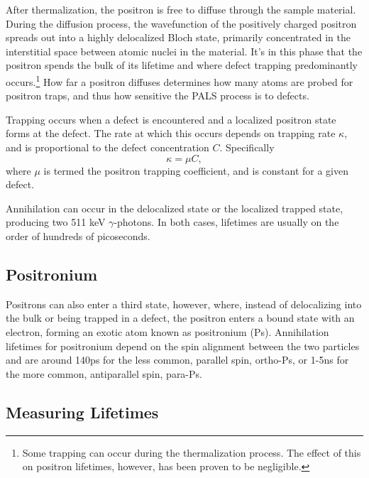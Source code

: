 After thermalization, the positron is free to diffuse through the sample material. During the diffusion process, the wavefunction of the positively charged positron spreads out into a highly delocalized Bloch state, primarily concentrated in the interstitial space between atomic nuclei in the material. It's in this phase that the positron spends the bulk of its lifetime and where defect trapping predominantly occurs.\footnote{Some trapping can occur during the thermalization process. The effect of this on positron lifetimes, however, has been proven to be negligible.} How far a positron diffuses determines how many atoms are probed for positron traps, and thus how sensitive the PALS process is to defects.

Trapping occurs when a defect is encountered and a localized positron state forms at the defect. The rate at which this occurs depends on trapping rate $\kappa$, and is proportional to the defect concentration $C$. Specifically
\begin{equation}
    \kappa = \mu C,
    \label{eq:traprate}
\end{equation}
where $\mu$ is termed the positron trapping coefficient, and is constant for a given defect.

Annihilation can occur in the delocalized state or the localized trapped state, producing two 511 keV $\gamma$-photons. In both cases, lifetimes are usually on the order of hundreds of picoseconds.

\subsection{Positronium\label{psform}}

Positrons can also enter a third state, however, where, instead of delocalizing into the bulk or being trapped in a defect, the positron enters a bound state with an electron, forming an exotic atom known as positronium (Ps). Annihilation lifetimes for positronium depend on the spin alignment between the two particles and are around 140ps for the less common, parallel spin, ortho-Ps, or 1-5ns for the more common, antiparallel spin, para-Ps.

\subsection{Measuring Lifetimes}

